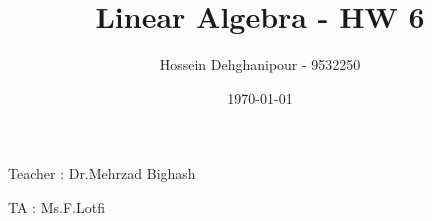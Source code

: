 \documentclass[a4paper,12pt]{article}
\begin{document}
    \begin{titlepage}
        \begin{center}
            \title{\Large{\textbf{Linear Algebra - HW 6}}}
            \author{Hossein Dehghanipour - 9532250}
            \date{\today}
        \end{center}
    \end{titlepage}

    \maketitle
\begin{doublespace}
\begin{flushleft}
\begin{doublespace}
	Teacher :  Dr.Mehrzad Bighash
\end{doublespace} 
\begin{doublespace}
	TA : Ms.F.Lotfi
\end{doublespace} 
\end{flushleft}
\end{doublespace} 

\newpage

\setmainfont{Times New Roman}
\tableofcontents
\thispagestyle{empty}
\newpage
{}


\fontsize{15pt}{15pt}
\newcommand{\nnl}{\newline \noindent}


\newcommand{\ptx}{ P_{tx} }
\newcommand{\prx}{ P_{rx} }
\newcommand{\inv}[1]{{#1}^{-1}}
\renewcommand\CancelColor{\color{red}}

\end{document}
